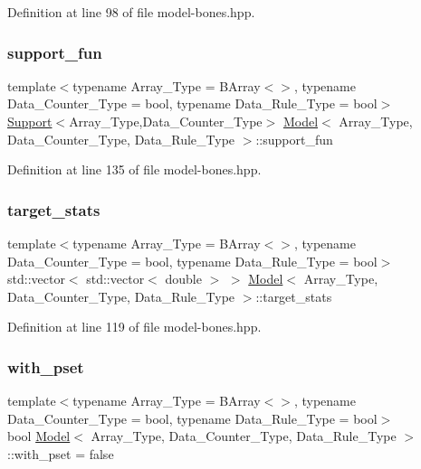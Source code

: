 Definition at line 98 of file model-\/bones.\+hpp.

\mbox{\label{class_model_acf989d2fcbbb83cca1c76d4c95cf3104}} 
\subsubsection{\texorpdfstring{support\+\_\+fun}{support\_fun}}
{\footnotesize\ttfamily template$<$typename Array\+\_\+\+Type  = B\+Array$<$$>$, typename Data\+\_\+\+Counter\+\_\+\+Type  = bool, typename Data\+\_\+\+Rule\+\_\+\+Type  = bool$>$ \\
\hyperlink{class_support}{Support}$<$Array\+\_\+\+Type,Data\+\_\+\+Counter\+\_\+\+Type$>$ \hyperlink{class_model}{Model}$<$ Array\+\_\+\+Type, Data\+\_\+\+Counter\+\_\+\+Type, Data\+\_\+\+Rule\+\_\+\+Type $>$\+::support\+\_\+fun}



Definition at line 135 of file model-\/bones.\+hpp.

\mbox{\label{class_model_a24ad6e57bff2297dcc7461609714f41b}} 
\subsubsection{\texorpdfstring{target\+\_\+stats}{target\_stats}}
{\footnotesize\ttfamily template$<$typename Array\+\_\+\+Type  = B\+Array$<$$>$, typename Data\+\_\+\+Counter\+\_\+\+Type  = bool, typename Data\+\_\+\+Rule\+\_\+\+Type  = bool$>$ \\
std\+::vector$<$ std\+::vector$<$ double $>$ $>$ \hyperlink{class_model}{Model}$<$ Array\+\_\+\+Type, Data\+\_\+\+Counter\+\_\+\+Type, Data\+\_\+\+Rule\+\_\+\+Type $>$\+::target\+\_\+stats}



Definition at line 119 of file model-\/bones.\+hpp.

\mbox{\label{class_model_afd37924e6fcfdc30c9fc5ad56f1c4947}} 
\subsubsection{\texorpdfstring{with\+\_\+pset}{with\_pset}}
{\footnotesize\ttfamily template$<$typename Array\+\_\+\+Type  = B\+Array$<$$>$, typename Data\+\_\+\+Counter\+\_\+\+Type  = bool, typename Data\+\_\+\+Rule\+\_\+\+Type  = bool$>$ \\
bool \hyperlink{class_model}{Model}$<$ Array\+\_\+\+Type, Data\+\_\+\+Counter\+\_\+\+Type, Data\+\_\+\+Rule\+\_\+\+Type $>$\+::with\+\_\+pset = false}




